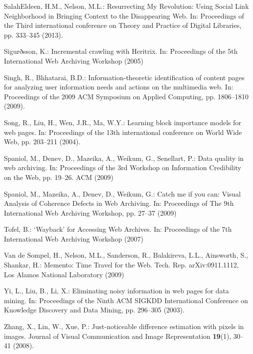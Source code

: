 \begin{thebibliography}{10}
SalahEldeen, H.M., Nelson, M.L.: {Resurrecting My Revolution: Using Social Link
  Neighborhood in Bringing Context to the Disappearing Web}.
\newblock In: {Proceedings of the Third international conference on Theory and
  Practice of Digital Libraries}, pp. 333--345 (2013).
\newblock {}

Sigurðsson, K.: Incremental crawling with {Heritrix}.
\newblock In: Proceedings of the 5th International Web Archiving Workshop
  (2005)

Singh, R., Bhhatarai, B.D.: Information-theoretic identification of content
  pages for analyzing user information needs and actions on the multimedia web.
\newblock In: Proceedings of the 2009 ACM Symposium on Applied Computing, pp.
  1806--1810 (2009).
\newblock {}

Song, R., Liu, H., Wen, J.R., Ma, W.Y.: Learning block importance models for
  web pages.
\newblock In: {Proceedings of the 13th international conference on World Wide
  Web}, pp. 203--211 (2004).
\newblock {}

Spaniol, M., Denev, D., Mazeika, A., Weikum, G., Senellart, P.: {Data quality
  in web archiving}.
\newblock In: {Proceedings of the 3rd Workshop on Information Credibility on
  the Web}, pp. 19--26. ACM (2009)

Spaniol, M., Mazeika, A., Denev, D., Weikum, G.: {Catch me if you can: Visual
  Analysis of Coherence Defects in Web Archiving}.
\newblock In: {Proceedings of The 9th International Web Archiving Workshop},
  pp. 27--37 (2009)

Tofel, B.: {`Wayback' for Accessing Web Archives}.
\newblock In: Proceedings of the 7th International Web Archiving Workshop
  (2007)

{Van de Sompel}, H., Nelson, M.L., Sanderson, R., Balakireva, L.L., Ainsworth,
  S., Shankar, H.: {Memento: Time Travel for the Web}.
\newblock Tech. Rep. arXiv:0911.1112, Los Alamos National Laboratory (2009)

Yi, L., Liu, B., Li, X.: Eliminating noisy information in web pages for data
  mining.
\newblock In: Proceedings of the Ninth ACM SIGKDD International Conference on
  Knowledge Discovery and Data Mining, pp. 296--305 (2003).
\newblock {}

Zhang, X., Lin, W., Xue, P.: Just-noticeable difference estimation with pixels
  in images.
\newblock Journal of Visual Communication and Image Representation
  \textbf{19}(1), 30--41 (2008).
\newblock {}

\end{thebibliography}






